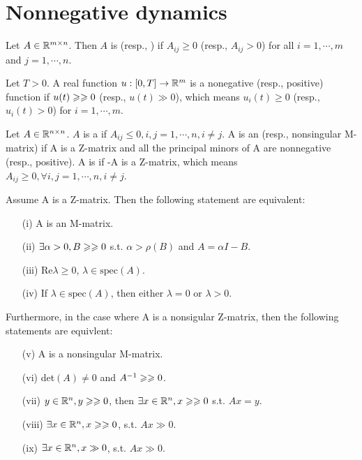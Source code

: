 \documentclass{paper}
\begin{document}
\section{Nonnegative dynamics}
\begin{defi}
Let $A\in \mathbb{R}^{m\times n}$. Then $A$ is  (resp., ) if $A_{ij}\geqslant 0$ (resp.,
$A_{ij}>0$) for all $i=1,\cdots,m$ and $j=1,\cdots,n$.
\end{defi}
\begin{defi}
Let $T>0$. A real function ${u}:{[0,T]}\rightarrow{\mathbb{R}^{m}}$ is a nonegative (resp., positive) function if
$u(t)\geqslant\geqslant 0$ (resp., $u(t)\gg 0$), which means $u_i(t)\geqslant 0$ (resp., $u_i(t)>0$) for $i=1,\cdots,m$.
\end{defi}
\begin{defi}
Let $A\in \mathbb{R}^{n\times n}$. $A$ is a  if $A_{ij}\leqslant 0,i,j=1,\cdots,n,i\neq j$. A is an
 (resp., nonsingular M-matrix) if A is a Z-matrix and all the principal minors of A are
nonnegative (resp., positive). A is  if -A is a Z-matrix, which means
$A_{ij}\geqslant 0,\forall i,j=1,\cdots,n,i\neq j$.
\end{defi}
\begin{lem} \label{lem1}
Assume A is a Z-matrix. Then the following statement are equivalent:
\begin{enumerate}
\item[(i)]    A is an M-matrix.
\item[(ii)]   $\exists \alpha>0, B\geqslant\geqslant 0$ s.t. $\alpha > \rho(B)$ and $A=\alpha I-B$.
\item[(iii)]  Re$\lambda\geq 0$, $\lambda\in \mathrm{spec}(A)$.
\item[(iv)]   If $\lambda\in \mathrm{spec}(A)$, then either $\lambda=0$ or $\lambda>0$.
\end{enumerate}
Furthermore, in the case where A is a nonsigular Z-matrix, then the following statements are equivlent:
\begin{enumerate}
\item[(v)]    A is a nonsingular M-matrix.
\item[(vi)]   det$(A)\neq0$ and $A^{-1}\geqslant\geqslant 0$.
\item[(vii)]  $y\in\mathbb{R}^{n},y\geqslant\geqslant 0$, then $\exists x\in\mathbb{R}^{n},x\geqslant\geqslant 0$ s.t. $Ax=y$.
\item[(viii)] $\exists x\in\mathbb{R}^{n},x\geqslant\geqslant 0$, s.t. $Ax\gg 0$.
\item[(ix)]   $\exists x\in\mathbb{R}^{n},x\gg 0$, s.t. $Ax\gg 0$.
\end{enumerate}
\end{lem}
\end{document}
